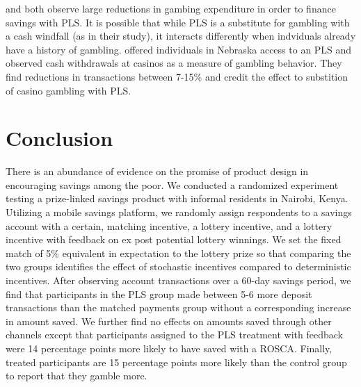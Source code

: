 \documentclass[11pt]{article}
\begin{document}

		\textcite{atalay_savings_2014} and \textcite{dizon_leveraging_2016} both observe large reductions in gambing expenditure in order to finance savings with PLS. It is possible that while PLS is a substitute for gambling with a cash windfall (as in their study), it interacts differently when indviduals already have a history of gambling. \textcite{cookson_when_2016} offered individuals in Nebraska access to an PLS and observed cash withdrawals at casinos as a measure of gambling behavior. They find reductions in transactions between 7-15\% and credit the effect to substition of casino gambling with PLS.

		

		

\section{Conclusion} \label{sec:conclusion}

	There is an abundance of evidence on the promise of product design in encouraging savings among the poor. We conducted a randomized experiment testing a prize-linked savings product with informal residents in Nairobi, Kenya. Utilizing a mobile savings platform, we randomly assign respondents to a savings account with a certain, matching incentive, a lottery incentive, and a lottery incentive with feedback on ex post potential lottery winnings. We set the fixed match of 5\% equivalent in expectation to the lottery prize so that comparing the two groups identifies the effect of stochastic incentives compared to deterministic incentives. After observing account transactions over a 60-day savings period, we find that participants in the PLS group made between 5-6 more deposit transactions than the matched payments group without a corresponding increase in amount saved. We further find no effects on amounts saved through other channels except that participants assigned to the PLS treatment with feedback were 14 percentage points more likely to have saved with a ROSCA. Finally, treated participants are 15 percentage points more likely than the control group to report that they gamble more.
\end{document}
